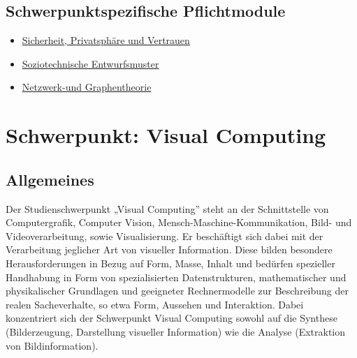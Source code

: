 \section*{Schwerpunktspezifische
Pflichtmodule\label{/mi-2017/modulbeschreibungen-master/schwerpunkt-soziotechnische-systeme}}\label{schwerpunktspezifische-pflichtmodulepathlabelmi-2017modulbeschreibungen-masterschwerpunkt-soziotechnische-systeme}

\begin{itemize}
\tightlist
\item
  \hyperref[/mi-2017/modulbeschreibungen-master/MA_WTW_Modul_IT-Sicherheit]{Sicherheit,
  Privatsphäre und Vertrauen}
\item
  \hyperref[/mi-2017/modulbeschreibungen-master/MA_SC_Soziotechnische_Entwurfsmuster]{Soziotechnische
  Entwurfsmuster}
\item
  \hyperref[/mi-2017/modulbeschreibungen-master/MA_SC_Modul_Netzwerk--und-Graphentheorie]{Netzwerk-und
  Graphentheorie}
\end{itemize}

\chapter{Schwerpunkt: Visual
Computing\label{/mi-2017/modulbeschreibungen-master/schwerpunkt-visual-computing}}\label{schwerpunkt-visual-computingpathlabelmi-2017modulbeschreibungen-masterschwerpunkt-visual-computing}

\section*{Allgemeines\label{/mi-2017/modulbeschreibungen-master/schwerpunkt-visual-computing}}\label{allgemeinespathlabelmi-2017modulbeschreibungen-masterschwerpunkt-visual-computing}

Der Studienschwerpunkt „Visual Computing'' steht an der Schnittstelle
von Computergrafik, Computer Vision, Mensch-Maschine-Kommunikation,
Bild- und Videoverarbeitung, sowie Visualisierung. Er beschäftigt sich
dabei mit der Verarbeitung jeglicher Art von visueller Information.
Diese bilden besondere Herausforderungen in Bezug auf Form, Masse,
Inhalt und bedürfen spezieller Handhabung in Form von spezialisierten
Datenstrukturen, mathematischer und physikalischer Grundlagen und
geeigneter Rechnermodelle zur Beschreibung der realen Sacheverhalte, so
etwa Form, Aussehen und Interaktion. Dabei konzentriert sich der
Schwerpunkt Visual Computing sowohl auf die Synthese (Bilderzeugung,
Darstellung visueller Information) wie die Analyse (Extraktion von
Bildinformation).

